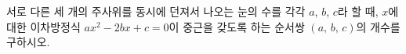 \hspace*{2mm}\begin{minipage}[t]{\dimexpr\linewidth-2mm\relax}\vspace{0pt}
서로 다른 세 개의 주사위를 동시에 던져서 나오는 눈의 수를 각각 $a$, $b$, $c$라 할 때, $x$에 대한 이차방정식 $ax^2-2bx+c=0$이 중근을 갖도록 하는 순서쌍 $(a,\,b,\,c)$의 개수를 구하시오.\end{minipage}
